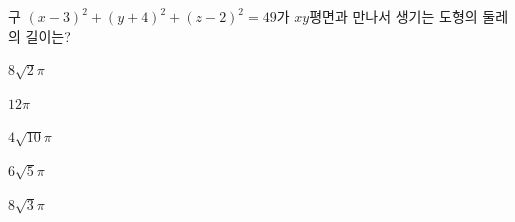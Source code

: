 구 $(x-3)^2+(y+4)^2+(z-2)^2=49$가 $xy$평면과 만나서 생기는 도형의 둘레의 길이는?
\begin{choices32}{\rule[-3ex]{0pt}{8ex}$8\sqrt{2}\pi$}{\rule[-3ex]{0pt}{8ex}$12\pi$}{\rule[-3ex]{0pt}{8ex}$4\sqrt{10}\pi$}{\rule[-3ex]{0pt}{8ex}$6\sqrt{5}\pi$}{\rule[-3ex]{0pt}{8ex}$8\sqrt{3}\pi$}\end{choices32}
